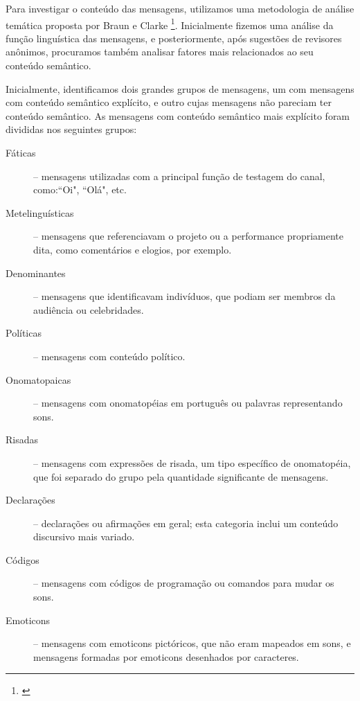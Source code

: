 Para investigar o conteúdo das mensagens, utilizamos uma metodologia de análise temática proposta por Braun e Clarke \footnote{\cite{Braun2006}}. Inicialmente fizemos uma análise da função linguística das mensagens, e posteriormente, após sugestões de revisores anônimos, procuramos também analisar fatores mais relacionados ao seu conteúdo semântico.



Inicialmente, identificamos dois grandes grupos de mensagens, um com mensagens com conteúdo semântico explícito, e outro cujas mensagens não pareciam ter conteúdo semântico. As mensagens com conteúdo semântico mais explícito foram divididas nos seguintes grupos:


\begin{description}
\item[Fáticas] -- mensagens utilizadas com a principal função de testagem do canal, como:``Oi", ``Olá", etc.
\item[Metelinguísticas] -- mensagens que referenciavam o projeto ou a performance propriamente dita, como comentários e elogios, por exemplo.
\item[Denominantes] -- mensagens que identificavam indivíduos, que podiam ser membros da audiência ou celebridades.
\item[Políticas] -- mensagens com conteúdo político.
\item[Onomatopaicas] -- mensagens com onomatopéias em português ou palavras representando sons.
\item[Risadas] -- mensagens com expressões de risada, um tipo específico de onomatopéia, que foi separado do grupo pela quantidade significante de mensagens. 
\item[Declarações] -- declarações ou afirmações em geral; esta categoria inclui um conteúdo discursivo mais variado.
\item[Códigos] -- mensagens com códigos de programação ou comandos para mudar os sons.
\item[Emoticons] -- mensagens com emoticons pictóricos, que não eram mapeados em sons, e mensagens formadas por emoticons desenhados por caracteres.
\end{description}

